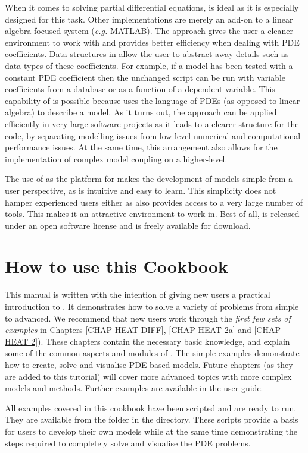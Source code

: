 When it comes to solving partial differential equations, \esc is ideal as it is
especially designed for this task. Other implementations are merely an add-on to
a linear algebra focused system (\textit{e.g.} MATLAB). The \esc approach gives
the user a cleaner environment to work with and provides better efficiency when
dealing with PDE coefficients. Data structures in \esc allow the user to
abstract away details such as data types of these coefficients. For example, if
a model has been tested with a constant PDE coefficient then the unchanged
script can be run with variable coefficients from a database or as a function of
a dependent variable. This capability of \esc is possible because \esc uses the
language of PDEs (as opposed to linear algebra) to describe a model. As it turns
out, the \esc approach can be applied efficiently in very large software
projects as it leads to a clearer structure for the code, by separating
modelling issues from low-level numerical and computational performance issues. 
At the same time, this arrangement also allows for the implementation of complex
model coupling on a higher-level. 

The use of \pyt as the platform for \esc makes the development of models simple
from a user perspective, as \pyt is intuitive and easy to learn. This simplicity
does not hamper experienced users either as \pyt also provides access to a very
large number of tools. This makes it an attractive environment to work in. Best
of all, \esc is released under an open software license and is freely available
for download.

\section{How to use this Cookbook}
This manual is written with the intention of giving new users a practical
introduction to \esc. It demonstrates how to solve a variety of problems from
simple to advanced. We recommend that new users work through the
\textit{first few sets of examples} in Chapters \ref{CHAP HEAT DIFF},
\ref{CHAP HEAT 2a} and \ref{CHAP HEAT 2}).
These chapters contain the necessary basic knowledge, and explain some of the
common aspects and modules of \esc. The simple examples demonstrate how to
create, solve and visualise PDE based models.
Future chapters (as they are added to this tutorial) will cover more advanced
topics with more complex models and methods. Further examples are available in
the \esc user guide.

All examples covered in this cookbook have been scripted and are ready to run.
They are available from the \exf folder in the \esc directory. These scripts
provide a basis for users to develop their own models while at the same time
demonstrating the steps required to completely solve and visualise the PDE
problems.



